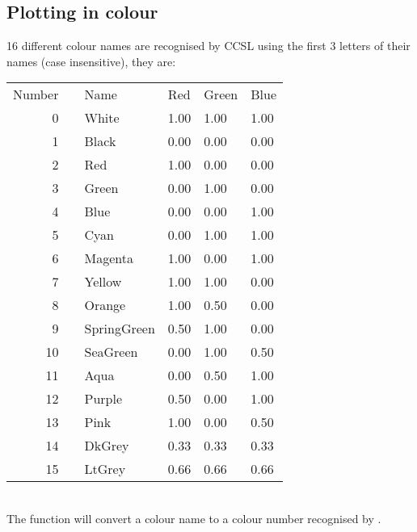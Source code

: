 \subsection{Plotting in colour} 
16 different colour names are recognised by CCSL using the first 3 letters of their names
(case insensitive), they are:\\[1ex]
\begin{tabular}{rlllll}
\hspace{10mm}Number&\quad&Name&Red&Green&Blue\\
0&&White&1.00&  1.00  &1.00\\
1&&Black &0.00  &0.00  &0.00\\
2&&Red  &1.00  &0.00  &0.00\\
3&&Green  &0.00  &1.00  &0.00\\
4&&Blue&0.00  &0.00  &1.00\\
5&&Cyan&0.00  &1.00  &1.00\\
6&&Magenta&1.00  &0.00  &1.00\\
7&&Yellow&1.00  &1.00  &0.00\\
8&&Orange&1.00  &0.50  &0.00\\
9&&SpringGreen&0.50  &1.00  &0.00\\
10&&SeaGreen&0.00  &1.00  &0.50\\
11&&Aqua&0.00  &0.50  &1.00\\
12&&Purple&0.50  &0.00  &1.00\\
13&&Pink&1.00  &0.00  &0.50\\
14&&DkGrey&0.33  &0.33  &0.33\\
15&&LtGrey&0.66  &0.66  &0.66 \\ 
\end{tabular} \\
The function  will convert a colour name to a colour number recognised by
.

